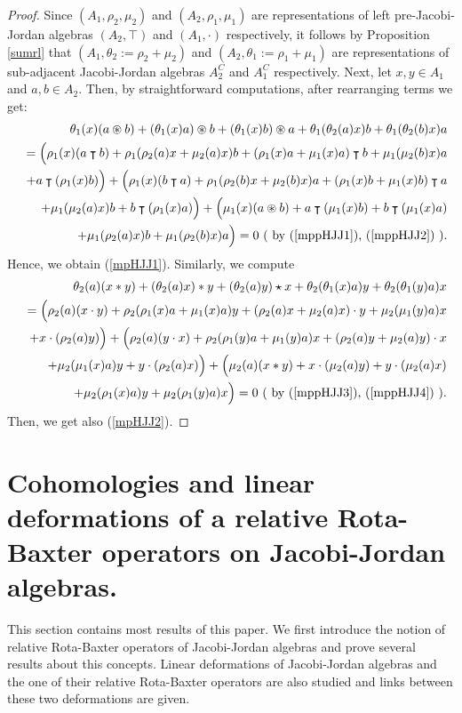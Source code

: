 \documentclass[12pt]{amsart}
\begin{document}
	\begin{proof}
		Since $(A_1,\rho_2,\mu_2)$ and $(A_2,\rho_1,\mu_1)$ are representations of left pre-Jacobi-Jordan algebras $(A_2,\intercal)$
		and $(A_1,\cdot)$ respectively, it follows by Proposition \ref{sumrl}  that $(A_1,\theta_2:=\rho_2+\mu_2)$ and $(A_2,\theta_1:=\rho_1+\mu_1)$ are representations of sub-adjacent Jacobi-Jordan algebras $A_2^C$ and $A_1^C$ respectively.
		Next, let $x,y\in A_1$ and $a,b\in A_2.$ Then, by straightforward computations, after rearranging terms we get:
		\begin{eqnarray}
			&& \theta_1(x)(a\circledast b)+(\theta_1(x)a)\circledast b+(\theta_1(x)b)\circledast a
			+\theta_1(\theta_2(a)x)b+\theta_1(\theta_2(b)x)a\nonumber\\
			&&=
			\Big(\rho_1(x)(a\intercal b)+\rho_1(\rho_2(a)x+\mu_2(a)x)b
			+(\rho_1(x)a+\mu_1(x)a)
			\intercal b
			+\mu_1(\mu_2(b)x)a\nonumber\\
			&&+a\intercal(\rho_1(x)b)\Big)
			+ \Big(\rho_1(x)(b\intercal a)+\rho_1(\rho_2(b)x+\mu_2(b)x)a+(\rho_1(x)b+\mu_1(x)b)\intercal a\nonumber\\
			&&
			+\mu_1(\mu_2(a)x)b+b\intercal(\rho_1(x)a)\Big)
			+\Big(\mu_1(x)(a\circledast b)+a\intercal(\mu_1(x)b)+b\intercal(\mu_1(x)a)
			\nonumber\\
			&&+\mu_1(\rho_2(a)x)b+\mu_1(\rho_2(b)x)a\Big)=0 
			\mbox{ ( by (\ref{mppHJJ1}), (\ref{mppHJJ2}) )}.\nonumber
		\end{eqnarray}
		Hence, we obtain (\ref{mpHJJ1}). Similarly, we compute
		\begin{eqnarray}
			&& \theta_2(a)(x\ast y)+(\theta_2(a)x)\ast y+(\theta_2(a)y)\star x
			+\theta_2(\theta_1(x)a)y+\theta_2(\theta_1(y)a)x\nonumber\\
			&&=
			\Big(\rho_2(a)(x\cdot y)+\rho_2(\rho_1(x)a+\mu_1(x)a)y
			+(\rho_2(a)x+\mu_2(a)x)\cdot y
			+\mu_2(\mu_1(y)a)x\nonumber\\
			&&+x\cdot(\rho_2(a)y)\Big)
			+ \Big(\rho_2(a)(y\cdot x)+\rho_2(\rho_1(y)a+\mu_1(y)a)x+(\rho_2(a)y+\mu_2(a)y)\cdot x\nonumber\\
			&&
			+\mu_2(\mu_1(x)a)y+y\cdot(\rho_2(a)x)\Big)
			+\Big(\mu_2(a)(x\ast y)+x\cdot(\mu_2(a)y)+y\cdot(\mu_2(a)x)
			\nonumber\\
			&&+\mu_2(\rho_1(x)a)y+\mu_2(\rho_1(y)a)x\Big)=0 
			\mbox{ ( by (\ref{mppHJJ3}), (\ref{mppHJJ4}) )}.\nonumber
		\end{eqnarray}
		Then, we get also (\ref{mpHJJ2}).
	\end{proof}	
	\section{Cohomologies and linear deformations of a relative Rota-Baxter operators on Jacobi-Jordan algebras.}
	This section  contains most results of this paper. We first introduce the notion of relative Rota-Baxter operators of Jacobi-Jordan algebras  and prove several results about this concepts. Linear deformations of Jacobi-Jordan algebras  and the one of their relative Rota-Baxter operators are also studied and links between these two deformations are given.
\end{document}
